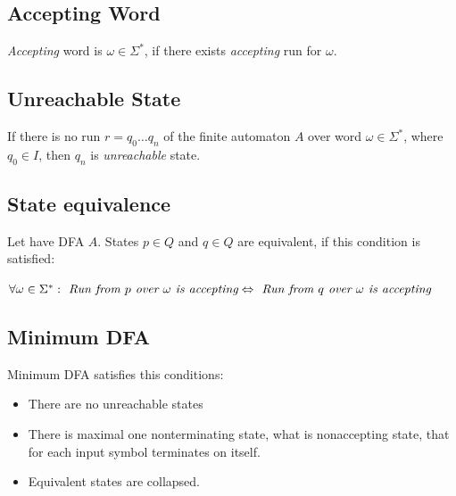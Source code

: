 	\subsection{Accepting Word}
	\label{defAWord}
	\begin{definition}
		\emph{Accepting} word is $\omega \in \Sigma^{*}$, if there exists \emph{accepting} run for $\omega$.
	\end{definition}

	\subsection{Unreachable State}
	\label{defAWord}
	\begin{definition}
		If there is no run $r=q_0\ldots q_n$ of the finite automaton $A$ over word $\omega \in \Sigma^{*}$, where $q_0\in I$, then $q_n$ is \emph{unreachable} state.
	\end{definition}

	\subsection{State equivalence}
	\label{defStateEq}
	\begin{definition}
		Let have DFA $A$. States $p \in Q$ and $q \in Q$ are equivalent, if this condition is satisfied:
		\begin{description}
			\item $\forall \omega \in \Sigma^{*}: \emph{ Run from } p \emph{ over } \omega \emph{ is accepting} \Leftrightarrow 
			\emph{ Run from } q \emph{ over } \omega \emph{ is accepting}$
		\end{description}
	\end{definition}

	\subsection{Minimum DFA}
	\label{defMinDFA}
	\begin{definition}
		Minimum DFA satisfies this conditions:
		\begin{itemize}
			\item There are no unreachable states
			\item There is maximal one nonterminating state, what is nonaccepting state, that for each input symbol terminates on itself.
			\item Equivalent states are collapsed.
		\end{itemize}
	\end{definition}


